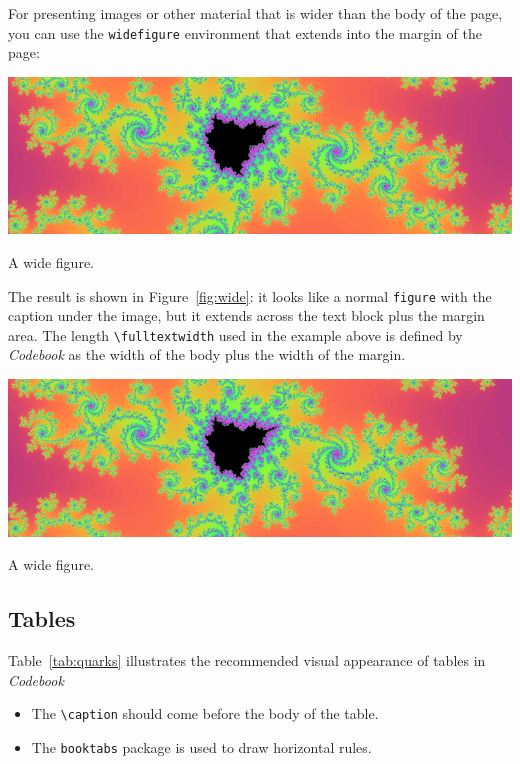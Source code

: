 \documentclass[minted]{codebook}
\begin{document}
For presenting images or other material that is wider than the body of the page, you can use the \texttt{widefigure} environment that extends into the margin of the page:
\begin{texcode}
\begin{widefigure}
  \includegraphics[width=\fulltextwidth]{mandel-wide.png}
  \caption{A wide figure.}
\end{widefigure}
\end{texcode}
The result is shown in Figure~\ref{fig:wide}: it looks like a normal \texttt{figure} with the caption under the image, but it extends across the text block plus the margin area.
The length \verb|\fulltextwidth| used in the example above is defined by \emph{Codebook} as the width of the body plus the width of the margin.

\begin{widefigure}
  \includegraphics[width=\fulltextwidth]{mandel-wide.png}
  \caption{A wide figure.}
  \label{fig:wide}
\end{widefigure}


\subsection{Tables}

Table~\ref{tab:quarks} illustrates the recommended visual appearance of tables in \emph{Codebook}


\begin{itemize}
  \item The \verb|\caption| should come before the body of the table.
  \item The \verb|booktabs| package is used to draw horizontal rules.
\end{itemize}
\end{document}
